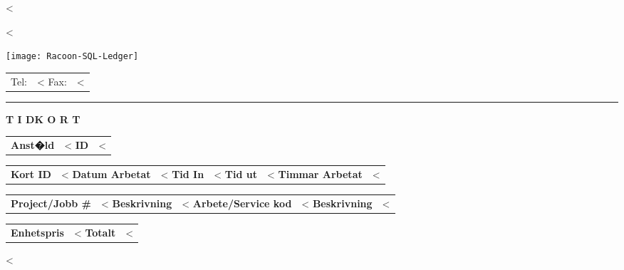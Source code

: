 \documentclass{scrartcl}
\begin{document}
\pagestyle{myheadings}
\thispagestyle{empty}

\fontsize{10pt}{12pt}\selectfont

\vspace*{-1.3cm}

\parbox{\textwidth}{%
  \parbox[b]{.42\textwidth}{%
    <%
   
    <%
  }
  \parbox[b]{.2\textwidth}{
    \texttt{[image: Racoon-SQL-Ledger]}
  }\hfill
  \begin{tabular}[b]{rr@{}}
  Tel: & <%
  Fax: & <%
  \end{tabular}

  \rule[1.5em]{\textwidth}{0.5pt}
}

\centerline{\textbf{T I D}\hspace{0.5cm}\textbf{K O R T}}

\vspace*{0.5cm}

\begin{tabular}[t]{ll}
  \textbf{Anst�ld} & <%
  \textbf{ID} & <%
\end{tabular}
\hfill
\begin{tabular}[t]{ll}
  \textbf{Kort ID} & <%
  \textbf{Datum Arbetat} & <%
  \textbf{Tid In} & <%
  \textbf{Tid ut} & <%
  \textbf{Timmar Arbetat} & <%
\end{tabular}

\vspace{1cm}

\begin{tabular}[b]{ll}
  \textbf{Project/Jobb \#} & <%
  \textbf{Beskrivning} & <%
  \textbf{Arbete/Service kod} & <%
  \textbf{Beskrivning} & <%
\end{tabular}
\hfill
\begin{tabular}[b]{lr}
  \textbf{Enhetspris} & <%
  \textbf{Totalt} & <%
\end{tabular}
  
\vspace{0.3cm}

<%
 
\end{document}

